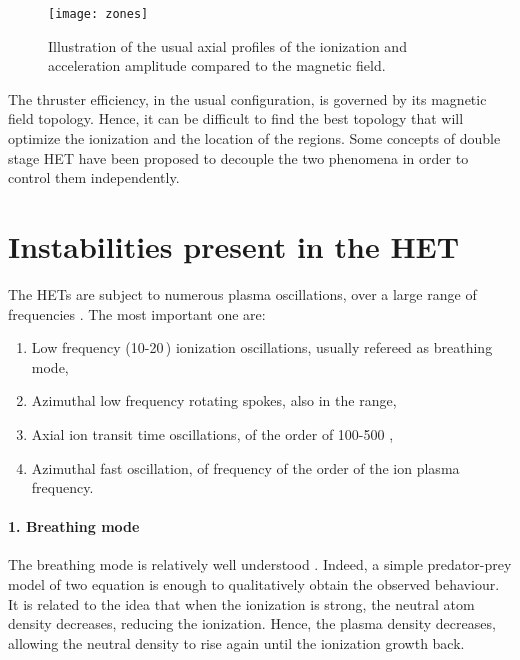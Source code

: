   \begin{figure}[hbtp]
    \centering
    \texttt{[image: zones]}
    \caption{Illustration of the usual axial profiles of the ionization and acceleration amplitude compared to the magnetic field.}
    \label{fig-zones}
  \end{figure}

  The thruster efficiency, in the usual configuration, is governed by its magnetic field topology.
  Hence, it can be difficult to find the best topology that will optimize the ionization and the location of the regions.
  Some concepts of double stage \ac{HET} have been proposed to decouple the two phenomena in order to control them independently.
  

  
  \section*{Instabilities present in the \ac{HET} }
  \label{sec-physics}

  The \ac{HET}s are subject to numerous plasma oscillations, over a large range of frequencies \citep{boeuf2017,choueiri2001}.
  The most important one are\string:
  \begin{enumerate}
    \item Low frequency (10-20\,\kilo\hertz) ionization oscillations, usually refereed as breathing mode,
    \item Azimuthal low frequency rotating spokes, also in the \kilo\hertz{} range,
    \item Axial ion transit time oscillations, of the order of 100-500 \kilo\hertz,
    \item Azimuthal fast oscillation, of frequency of the order of the ion plasma frequency.
  \end{enumerate} 

  \paragraph{1. Breathing mode\\}
  The breathing mode is relatively well understood \citep{boeuf1998,barral2009,hara2014}.
  Indeed, a simple predator-prey model of two equation is enough to qualitatively obtain the observed behaviour.
  It is related to the idea that when the ionization is strong, the neutral atom density decreases, reducing the ionization.
  Hence, the plasma density decreases, allowing the neutral density to rise again until the ionization growth back.

